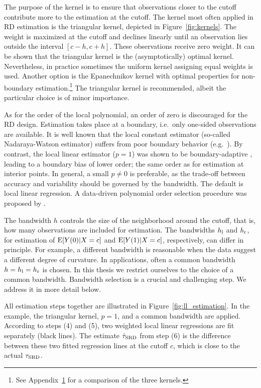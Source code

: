 The purpose of the kernel is to ensure that observations closer to the cutoff contribute more to the estimation at the cutoff.
The kernel most often applied in RD estimation is the triangular kernel, depicted in Figure~\ref{fig:kernels}.
The weight is maximized at the cutoff and declines linearly until an observation lies outside the interval $[c-h, c+h]$.
These observations receive zero weight.
It can be shown \parencite{Cheng_1997} that the triangular kernel is the (asymptotically) optimal kernel.
Nevertheless, in practice sometimes the uniform kernel assigning equal weights is used.
Another option is the Epanechnikov kernel with optimal properties for non-boundary estimation.\footnote{See Appendix~\hyperref[appendix:kernels]{1} for a comparison of the three kernels.}
The triangular kernel is recommended, albeit the particular choice is of minor importance.

As for the order of the local polynomial, an order of zero is discouraged for the RD design.
Estimation takes place at a boundary, i.e.\ only one-sided observations are available.
It is well known that the local constant estimator (so-called Nadaraya-Watson estimator) suffers from poor boundary behavior (e.g.\ \cite[Section~19.10]{Hansen_2022}).
By contrast, the local linear estimator ($p = 1$) was shown to be boundary-adaptive \parencite{Fan_1992}, leading to a boundary bias of lower order;
the same order as for estimation at interior points.
In general, a small $p \neq 0$ is preferable, as the trade-off between accuracy and variability should be governed by the bandwidth.
The default is local linear regression.
A data-driven polynomial order selection procedure was proposed by \textcite{Pei_2022}.

The bandwidth $h$ controls the size of the neighborhood around the cutoff, that is, how many observations are included for estimation.
The bandwidths $h_{\textup{l}}$ and $h_{\textup{r}}$, for estimation of $\operatorname{E}[Y(0) | X = c]$ and $\operatorname{E}[Y(1) | X = c]$, respectively, can differ in principle.
For example, a different bandwidth is reasonable when the data suggest a different degree of curvature.
In applications, often a common bandwidth $h = h_{\textup{l}} = h_{\textup{r}}$ is chosen.
In this thesis we restrict ourselves to the choice of a common bandwidth.
Bandwidth selection is a crucial and challenging step.
We address it in more detail below.

All estimation steps together are illustrated in Figure~\ref{fig:ll_estimation}.
In the example, the triangular kernel, $p = 1$, and a common bandwidth are applied.
According to steps (4) and (5), two weighted local linear regressions are fit separately (black lines).
The estimate $\hat{\tau}_{\textup{SRD}}$ from step (6) is the difference between these two fitted regression lines at the cutoff $c$, which is close to the actual $\tau_{\textup{SRD}}$. 

